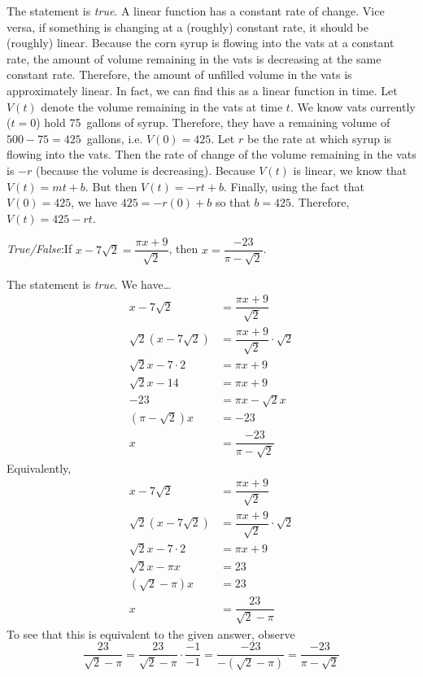 \documentclass[11pt,letterpaper]{article}
\begin{document}
\sol The statement is \textit{true}. A linear function has a constant rate of change. Vice versa, if something is changing at a (roughly) constant rate, it should be (roughly) linear. Because the corn syrup is flowing into the vats at a constant rate, the amount of volume remaining in the vats is decreasing at the same constant rate. Therefore, the amount of unfilled volume in the vats is approximately linear. In fact, we can find this as a linear function in time. Let $V(t)$ denote the volume remaining in the vats at time $t$. We know vats currently ($t= 0$) hold 75~gallons of syrup. Therefore, they have a remaining volume of $500 - 75= 425$~gallons, i.e. $V(0)= 425$. Let $r$ be the rate at which syrup is flowing into the vats. Then the rate of change of the volume remaining in the vats is $-r$ (because the volume is decreasing). Because $V(t)$ is linear, we know that $V(t)= mt + b$. But then $V(t)= -rt + b$. Finally, using the fact that $V(0)= 425$, we have $425= -r(0) + b$ so that $b= 425$. Therefore, $V(t)= 425 - rt$. \pvspace{1.3cm}



\newpage



\quizsol \textit{True/False}:If $x - 7 \sqrt{2}= \dfrac{\pi x + 9}{\sqrt{2}}$, then $x= \dfrac{-23}{\pi - \sqrt{2}}$. \pspace

\sol The statement is \textit{true}. We have\dots
	\[
	\begin{aligned}
	x - 7 \sqrt{2}&= \dfrac{\pi x + 9}{\sqrt{2}} \\
	\sqrt{2} (x - 7\sqrt{2})&= \dfrac{\pi x + 9}{\sqrt{2}} \cdot \sqrt{2} \\
	\sqrt{2}x - 7 \cdot 2&= \pi x + 9 \\
	\sqrt{2}x - 14&= \pi x + 9 \\
	-23&= \pi x - \sqrt{2} x \\
	(\pi - \sqrt{2})x&= -23 \\
	x&= \dfrac{-23}{\pi - \sqrt{2}}
	\end{aligned}
	\]
Equivalently, 
	\[
	\begin{aligned}
	x - 7 \sqrt{2}&= \dfrac{\pi x + 9}{\sqrt{2}} \\
	\sqrt{2} (x - 7\sqrt{2})&= \dfrac{\pi x + 9}{\sqrt{2}} \cdot \sqrt{2} \\
	\sqrt{2}x - 7 \cdot 2&= \pi x + 9 \\
	\sqrt{2}x - \pi x&= 23 \\
	(\sqrt{2} - \pi) x&= 23 \\
	x&= \dfrac{23}{\sqrt{2} - \pi}
	\end{aligned}
	\]
To see that this is equivalent to the given answer, observe
	\[
	\dfrac{23}{\sqrt{2} - \pi}= \dfrac{23}{\sqrt{2} - \pi} \cdot \dfrac{-1}{-1}= \dfrac{-23}{-(\sqrt{2} - \pi)}= \dfrac{-23}{\pi - \sqrt{2}}
	\]
\end{document}
